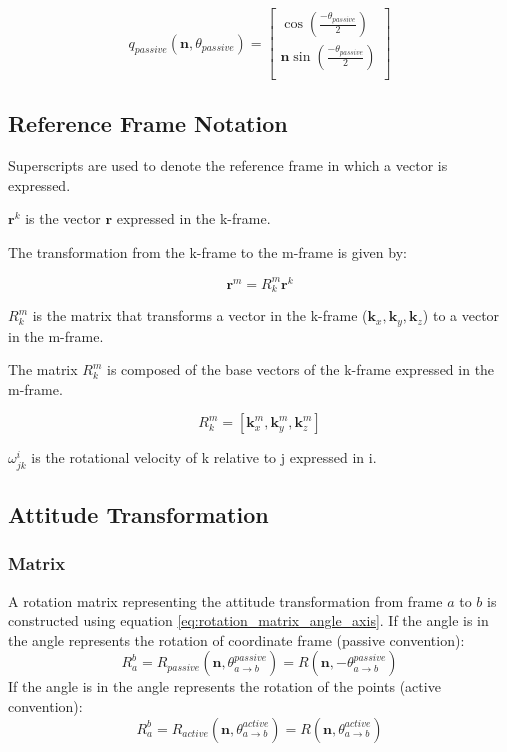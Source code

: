 \documentclass[a4paper]{paper}
\begin{document}
\begin{equation}
    q_{passive}(\bm n, \theta_{passive}) =
        \left[\begin{array}{c}
            \cos{(\frac{-\theta_{passive}}{2})}\\
            \bm{n} \sin{(\frac{-\theta_{passive}}{2})}\\
        \end{array}\right]
\end{equation}



\subsection{Reference Frame Notation}


Superscripts are used to denote the reference frame in which a vector is expressed.

$\bm{r}^k$ is the vector $\bm{r}$ expressed in the k-frame.

The transformation from the k-frame to the m-frame is given by:

\begin{equation}
    \bm{r}^m = R_k^m \bm{r}^k
\end{equation}

$R_k^m$ is the matrix that transforms a vector in the k-frame ($\bm{k}_x, \bm{k}_y, \bm{k}_z$) to a vector in the m-frame.

The matrix $R_k^m$ is composed of the base vectors of the k-frame expressed in the m-frame.

\begin{equation}
    R_k^m = \left[ \bm{k}_x^m, \bm{k}_y^m, \bm{k}_z^m \right]
\end{equation}

$\omega^i_{jk}$ is the rotational velocity of k relative to j expressed in i.

\subsection{Attitude Transformation}

\subsubsection{Matrix}

A rotation matrix representing the attitude transformation from frame $a$ to $b$ is constructed using equation \ref{eq:rotation_matrix_angle_axis}.
If the angle is in the angle represents the rotation of coordinate frame (passive convention):
\begin{equation}
    R_a^b = R_{passive}(\bm{n}, \theta^{passive}_{a \rightarrow b}) = R(\bm{n}, -\theta^{passive}_{a \rightarrow b})
\end{equation}
If the angle is in the angle represents the rotation of the points (active convention):
\begin{equation}
    R_a^b = R_{active}(\bm{n}, \theta^{active}_{a \rightarrow b}) = R(\bm{n}, \theta^{active}_{a \rightarrow b})
\end{equation}
\end{document}
